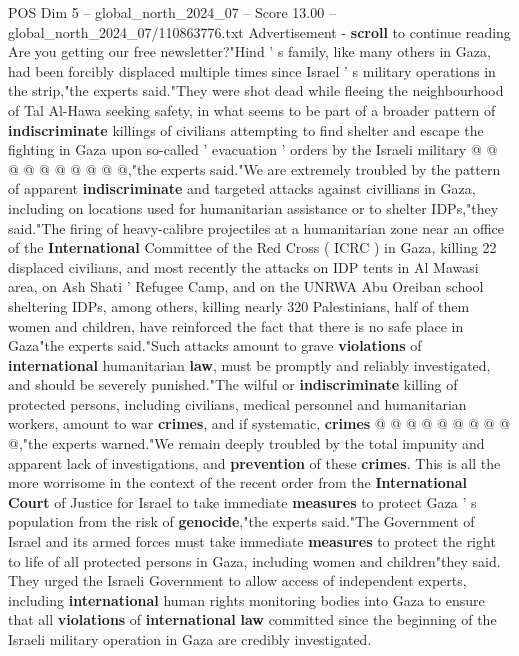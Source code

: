 \begin{textsample}{POS Dim 5 – global\_north\_2024\_07 – Score 13.00 – global\_north\_2024\_07/110863776.txt}
Advertisement - \textbf{scroll} to continue reading Are you getting our free newsletter?"Hind ' s family, like many others in Gaza, had been forcibly displaced multiple times since Israel ' s military operations in the strip,"the experts said."They were shot dead while fleeing the neighbourhood of Tal Al-Hawa seeking safety, in what seems to be part of a broader pattern of \textbf{indiscriminate} killings of civilians attempting to find shelter and escape the fighting in Gaza upon so-called ' evacuation ' orders by the Israeli military @ @ @ @ @ @ @ @ @ @,"the experts said."We are extremely troubled by the pattern of apparent \textbf{indiscriminate} and targeted attacks against civillians in Gaza, including on locations used for humanitarian assistance or to shelter IDPs,"they said."The firing of heavy-calibre projectiles at a humanitarian zone near an office of the \textbf{International} Committee of the Red Cross ( ICRC ) in Gaza, killing 22 displaced civilians, and most recently the attacks on IDP tents in Al Mawasi area, on Ash Shati ' Refugee Camp, and on the UNRWA Abu Oreiban school sheltering IDPs, among others, killing nearly 320 Palestinians, half of them women and children, have reinforced the fact that there is no safe place in Gaza"the experts said."Such attacks amount to grave \textbf{violations} of \textbf{international} humanitarian \textbf{law}, must be promptly and reliably investigated, and should be severely punished."The wilful or \textbf{indiscriminate} killing of protected persons, including civilians, medical personnel and humanitarian workers, amount to war \textbf{crimes}, and if systematic, \textbf{crimes} @ @ @ @ @ @ @ @ @ @,"the experts warned."We remain deeply troubled by the total impunity and apparent lack of investigations, and \textbf{prevention} of these \textbf{crimes}.
This is all the more worrisome in the context of the recent order from the \textbf{International} \textbf{Court} of Justice for Israel to take immediate \textbf{measures} to protect Gaza ' s population from the risk of \textbf{genocide},"the experts said."The Government of Israel and its armed forces must take immediate \textbf{measures} to protect the right to life of all protected persons in Gaza, including women and children"they said.
They urged the Israeli Government to allow access of independent experts, including \textbf{international} human rights monitoring bodies into Gaza to ensure that all \textbf{violations} of \textbf{international} \textbf{law} committed since the beginning of the Israeli military operation in Gaza are credibly investigated.

\end{textsample}
